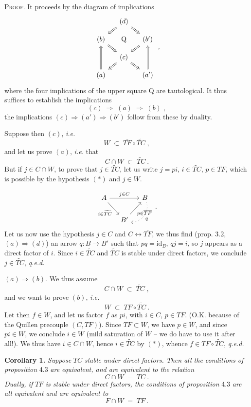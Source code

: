 \documentclass[11pt]{article}
\newcommand{\printedpage}[1]{\marginpar{\footnotesize p.~#1}}
\newcommand{\msp}[1]{\marginpar{\footnotesize [#1]}}
\newcommand{\id}{\mathrm{id}}
\begin{document}
\textsc{Proof}. It proceeds by the diagram of implications
\[
\begin{tikzcd}[column sep=small, row sep=small]
& (d) \arrow[dl, Rightarrow] \arrow[dr, Rightarrow] & \\
(b) \arrow[dr, Rightarrow] & \mathrm{Q} & (b') \arrow[dl, Rightarrow] \\
& (c) \arrow[dl, Rightarrow] \arrow[dr, Rightarrow] & \\
(a) \arrow[uu, Rightarrow] & & (a') \arrow[uu, Rightarrow]
\end{tikzcd}
\;,
\]
\printedpage{23}
where the four implications of the upper square Q are tautological. It thus suffices to establish the implications
\[
(c) \;\Longrightarrow\; (a) \;\Longrightarrow\; (b)\;,
\]
the implications $(c)\Longrightarrow(a')\Longrightarrow(b')$ follow from these by duality.

Suppose then $(c)$, \textit{i.e.}
\[
W \;\subset\; \overline{TF}\circ\widetilde{TC}\;,
\tag*{$(*)$}
\]
and let us prove $(a)$, \textit{i.e.} that
\[
C\cap W \;\subset\; \widetilde{TC}\ .
\]
But if $j\in C\cap W$, to prove that $j\in\widetilde{TC}$, let us write $j=pi$, $i\in\widetilde{TC}$, $p\in\overline{TF}$, which is possible by the hypothesis $(*)$ and $j\in W$.

\msp{page 34}
\[
\begin{tikzcd}[column sep=small]
A \arrow[rr, "j\in C"] \arrow[dr, "i\in\widetilde{TC}"'] & & B \arrow[dl, dotted, bend left=60, "q"] \\
& B' \arrow[ur, "p\in\overline{TF}"'] &
\end{tikzcd}
\;.
\]
Let us now use the hypothesis $j\in C$ and $C\longleftrightarrow\overline{TF}$, we thus find (prop. 3.2, $(a)\Longrightarrow(d)$) an arrow $q:B\longrightarrow B'$ such that $pq=\id_B$, $qj=i$, so $j$ appears as a direct factor of $i$. Since $i\in\widetilde{TC}$ and $\widetilde{TC}$ is stable under direct factors, we conclude $j\in\widetilde{TC}$, \quad \textit{q.e.d.}

$(a)\Longrightarrow(b)$. We thus assume
\[
C\cap W \;\subset\; \widetilde{TC}\;,
\tag*{$(*)$}
\]
and we want to prove $(b)$, \textit{i.e.}
\[
W \;\subset\; TF\circ\widetilde{TC}\ .
\]
Let then $f\in W$, and let us factor $f$ as $pi$, with $i\in C$, $p\in TF$. (O.K. because of the Quillen precouple $(C,TF)$). Since $TF\subset W$, we have $p\in W$, and since $pi\in W$, we conclude $i\in W$ (mild saturation of $W$ -- we do have to use it after all!). We thus have $i\in C{\cap}W$, hence $i\in\widetilde{TC}$ by $(*)$, whence $f\in TF\circ\widetilde{TC}$, \quad \textit{q.e.d.}

\textbf{Corollary 1.} \textit{Suppose} $TC$ \textit{stable under direct factors. Then all the conditions of proposition} 4.3 \textit{are equivalent, and are equivalent to the relation}
\[
C\cap W \;=\; TC\ .
\tag*{(4.3.4)}
\]
\textit{Dually, if} $TF$ \textit{is stable under direct factors, the conditions of proposition} 4.3 \textit{are all equivalent and are equivalent to}
\[
F\cap W \;=\; TF\ .
\tag*{(4.3.4$'$)}
\]
\end{document}
